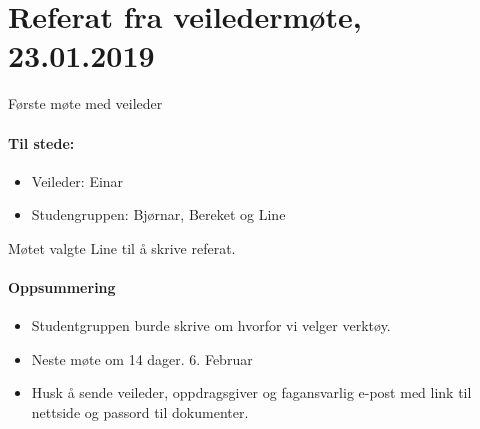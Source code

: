 \chapter{Referat fra veiledermøte, 23.01.2019}

Første møte med veileder

\subsubsection{Til stede:} 
\begin{itemize}
\item Veileder: Einar
\item Studengruppen: Bjørnar, Bereket og Line
\end{itemize}


Møtet valgte Line til å skrive referat.

\subsubsection{Oppsummering}

\begin{itemize}
\item Studentgruppen burde skrive om hvorfor vi velger verktøy.
\item Neste møte om 14 dager. 6. Februar
\item Husk å sende veileder, oppdragsgiver og fagansvarlig e-post med link til nettside og passord til dokumenter. 
\end{itemize}
